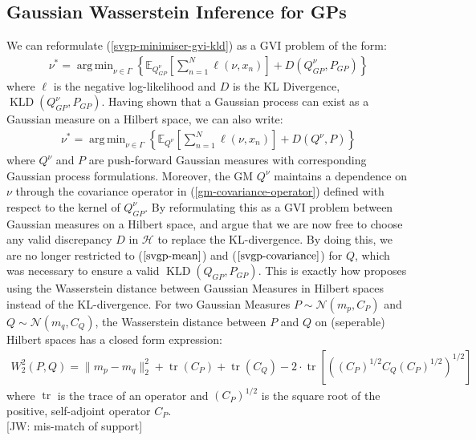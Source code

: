 \documentclass{article}
\newcommand{\jw}[1]{{\color{gray} [JW: #1]}}
\newcommand{\KLD}{\operatorname{KLD}}
\newcommand{\tr}{\operatorname{tr}}
\DeclareMathOperator*{\argmin}{arg\,min}
\numberwithin{equation}{section}
\begin{document}
\subsection{Gaussian Wasserstein Inference for GPs}
We can reformulate (\ref{svgp-minimiser-gvi-kld}) as a GVI problem of the form:
\begin{align}
    \label{svgp-gwi-gp}
    \nu^* = \argmin_{\nu \in \Gamma} \left\{ \mathbb{E}_{Q_{GP}^{\nu}}\left[\sum_{n=1}^N \ell(\nu, x_n)\right] + D(Q_{GP}^{\nu}, P_{GP})\right\}
\end{align}
where $\ell$ is the negative log-likelihood and $D$ is the KL Divergence, $\KLD(Q_{GP}^{\nu}, P_{GP})$. Having shown that a Gaussian process can exist as a Gaussian measure on a Hilbert space, we can also write:
\begin{align}
    \label{svgp-gwi-gm}
    \nu^* = \argmin_{\nu \in \Gamma} \left\{ \mathbb{E}_{Q^{\nu}}\left[\sum_{n=1}^N \ell(\nu, x_n)\right] + D(Q^{\nu}, P)\right\}
\end{align}
where $Q^{\nu}$ and $P$ are push-forward Gaussian measures with corresponding Gaussian process formulations. Moreover, the GM $Q^{\nu}$ maintains a dependence on $\nu$ through the covariance operator in (\ref{gm-covariance-operator}) defined with respect to the kernel of $Q_{GP}^{\nu}$. By reformulating this as a GVI problem between Gaussian measures on a Hilbert space, \cite{wild2022generalized} and \cite{knoblauch2022optimization} argue that we are now free to choose any valid discrepancy $D$ in $\mathcal{H}$ to replace the KL-divergence. By doing this, we are no longer restricted to ($\ref{svgp-mean}$) and ($\ref{svgp-covariance}$) for $Q$, which was necessary to ensure a valid $\KLD(Q_{GP},  P_{GP})$. This is exactly how \cite{wild2022generalized} proposes using the Wasserstein distance between Gaussian Measures in Hilbert spaces instead of the KL-divergence. For two Gaussian Measures $P \sim \mathcal{N}(m_p, C_P)$ and $Q \sim \mathcal{N}(m_q, C_Q)$, the Wasserstein distance between $P$ and $Q$ on (seperable) Hilbert spaces has a closed form expression:
\begin{align}
    \label{wasserstein-distance}
    W_2^2(P, Q) = \| m_p - m_q\|_2^2 + \tr(C_P) + \tr(C_Q) - 2 \cdot \tr \left[ \left( \left(C_P\right)^{1/2} C_Q \left(C_P\right)^{1/2}\right)^{1/2}\right]
\end{align}
where $\tr$ is the trace of an operator and $\left(C_P\right)^{1/2}$ is the square root of the positive, self-adjoint operator $C_P$.
\\\jw{mis-match of support}
\end{document}
